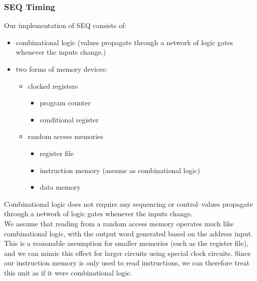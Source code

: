 \documentclass[11pt]{article}
\begin{document}
\subsubsection{SEQ Timing}
\label{sec:orge33b23d}
Our implementation of SEQ consists of:\\
\begin{itemize}
\item combinational logic (values propagate through a network of logic gates whenever the inputs change.)\\
\item two forms of memory devices:\\
\begin{itemize}
\item clocked registers\\
\begin{itemize}
\item program counter\\
\item conditional register\\
\end{itemize}
\item random access memories\\
\begin{itemize}
\item register file\\
\item instruction memory (assume as combinational logic)\\
\item data memory\\
\end{itemize}
\end{itemize}
\end{itemize}

Combinational logic does not require any sequencing or control--values propagate through a network of logic gates whenever the inputs change.\\

We assume that reading from a random access memory operates much like combinational logic, with the output word generated based on the address input. This is a reasonable assumption for smaller memories (such as the register file), and we can mimic this effect for larger circuits using special clock circuits. Since our instruction memory is only used to read instructions, we can therefore treat this unit as if it were combinational logic.\\
\end{document}
